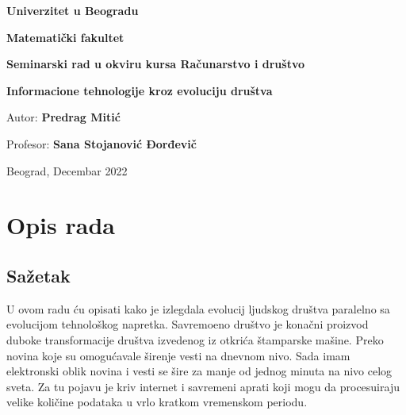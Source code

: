 \documentclass[10pt]{article}
\begin{document}
	
	\begin{titlepage}
		\thispagestyle{empty}
		\begin{center}
			\vspace*{1cm}
			\begin{large}
			
			    \textbf{Univerzitet u Beogradu}
				
				\textbf{Matematički fakultet}
				
				\vspace{2cm}
				
				\textbf{Seminarski rad u okviru kursa Računarstvo i društvo}
				
				\vspace{1cm}
				\textbf{\huge{Informacione tehnologije kroz evoluciju društva}}
			\end{large}
			
		\end{center}
		\vspace{7cm}
		\begin{flushright}
			Autor: \textbf{Predrag Mitić}
			
			Profesor: \textbf{Sana Stojanović Đorđevič}
			

		\end{flushright}
		\vspace{1cm}
		\begin{center}
			Beograd, Decembar 2022
		\end{center}
	\end{titlepage}
	
	
	\tableofcontents
	
	\pagebreak
	
	\section{Opis rada}
	
	\subsection{Sažetak}
	
	U ovom radu ću opisati kako je izlegdala evolucij ljudskog društva paralelno sa evolucijom tehnološkog napretka. Savremoeno društvo je konačni proizvod duboke transformacije društva izvedenog iz otkrića štamparske mašine. Preko novina koje su omogućavale širenje vesti na dnevnom nivo. Sada imam elektronski oblik novina i vesti se šire za manje od jednog minuta na nivo celog sveta.  Za tu pojavu je kriv internet i savremeni aprati koji mogu da procesuiraju velike količine podataka u vrlo kratkom vremenskom periodu.
	
\end{document}
